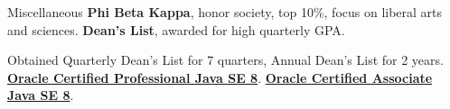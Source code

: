 \begin{rubric}{Miscellaneous}
    \entry*[2018] \textbf{Phi Beta Kappa}, honor society, top 10\%, focus on liberal arts and sciences.
    \entry*[2016-2018] \textbf{Dean's List}, awarded for high quarterly GPA.
    \par Obtained Quarterly Dean's List for 7 quarters, Annual Dean's List for 2 years.
    \entry*[2018] \textbf{\href{https://www.youracclaim.com/badges/c3d44a4e-fabc-4abb-b4fd-2079a364f6bd/public_url}{Oracle Certified Professional Java SE 8}}.
    \entry*[2017] \textbf{\href{https://www.youracclaim.com/badges/fead7b2a-0382-45ea-9566-fb5a39d71972/public_url}{Oracle Certified Associate Java SE 8}}.
\end{rubric}